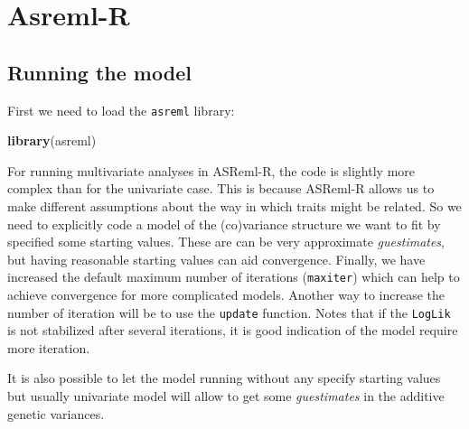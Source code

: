 \documentclass[
  12pt,
]{book}
\newenvironment{Shaded}{\begin{snugshade}}{\end{snugshade}}
\newcommand{\KeywordTok}[1]{\textcolor[rgb]{0.13,0.29,0.53}{\textbf{#1}}}
\newcommand{\NormalTok}[1]{#1}
\begin{document}
\hypertarget{asreml-biv}{%
\section{Asreml-R}\label{asreml-biv}}

\hypertarget{running-the-model-3}{%
\subsection{Running the model}\label{running-the-model-3}}

First we need to load the \texttt{asreml} library:

\begin{Shaded}
\begin{Highlighting}[]
\KeywordTok{library}\NormalTok{(asreml)}
\end{Highlighting}
\end{Shaded}

For running multivariate analyses in ASReml-R, the code is slightly more complex than for the univariate case. This is because ASReml-R allows us to make different assumptions about the way in which traits might be related. So we need to explicitly code a model of the (co)variance structure we want to fit by specified some starting values. These are can be very approximate \emph{guestimates}, but having reasonable starting values can aid convergence. Finally, we have increased the default maximum number of iterations (\texttt{maxiter}) which can help to achieve convergence for more complicated models. Another way to increase the number of iteration will be to use the \texttt{update} function. Notes that if the \texttt{LogLik} is not stabilized after several iterations, it is good indication of the model require more iteration.

It is also possible to let the model running without any specify starting values but usually univariate model will allow to get some \emph{guestimates} in the additive genetic variances.
\end{document}
